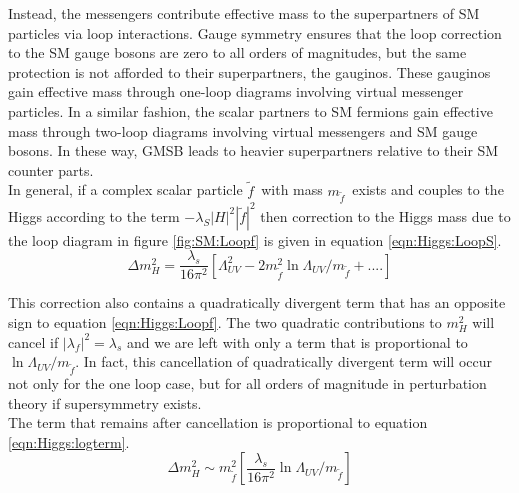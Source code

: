 \indent Instead, the messengers contribute effective mass to the superpartners of SM particles via loop interactions.  Gauge symmetry ensures that the loop correction to the SM gauge bosons are zero to all orders of magnitudes, but the same protection is not afforded to their superpartners, the gauginos.  These gauginos gain effective mass through one-loop diagrams involving virtual messenger particles.  In a similar fashion, the scalar partners to SM fermions gain effective mass through two-loop diagrams involving virtual messengers and SM gauge bosons.  In these way, GMSB leads to heavier superpartners relative to their SM counter parts.  \\


\indent In general, if a complex scalar particle $\tilde{f}$~with mass $m_{\tilde{f}}$~exists and couples to the Higgs according to the term $-\lambda_S|H|^2|\tilde{f}|^2$ then correction to the Higgs mass due to the loop diagram in figure \ref{fig:SM:Loopf} is given in equation \ref{eqn:Higgs:LoopS}. \\

\begin{equation}
\label{eqn:Higgs:LoopS}
\Delta m_H^2 = \frac{\lambda_s}{16\pi^2}[\Lambda^2_{UV} - 2m_{\tilde{f}}^2 \ln{\Lambda_{UV}/m_{\tilde{f}}}+ ....]
\end{equation}

\indent This correction also contains a quadratically divergent term that has an opposite sign to equation \ref{eqn:Higgs:Loopf}.  The two quadratic contributions to $m_H^2$ will cancel if $|\lambda_f|^2 = \lambda_s$ and we are left with only a term that is proportional to $\ln{\Lambda_{UV}/m_{\tilde{f}}}$. In fact, this cancellation of quadratically divergent term will occur not only for the one loop case, but for all orders of magnitude in perturbation theory if supersymmetry exists. \\

\indent The term that remains after cancellation is proportional to equation \ref{eqn:Higgs:logterm}. \\

\begin{equation}
\label{eqn:Higgs:LoopS}
\Delta m_H^2 \sim m_{\tilde{f}}^2[\frac{\lambda_s}{16\pi^2}\ln{\Lambda_{UV}/m_{\tilde{f}}}]
\end{equation}

